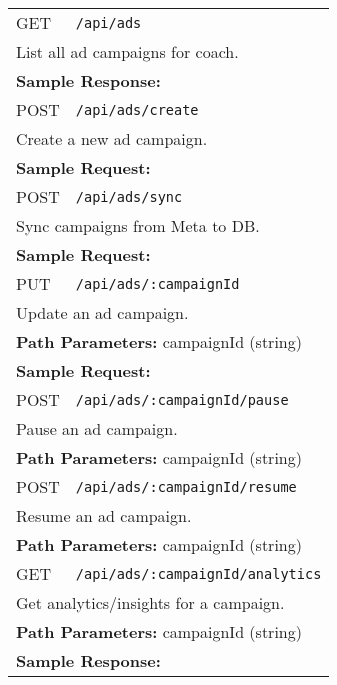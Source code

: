 \documentclass[11pt,a4paper]{article}
\begin{document}
\begin{longtable}{p{2.5cm}p{10cm}}
GET & \texttt{/api/ads} \\
\multicolumn{2}{p{13cm}}{List all ad campaigns for coach.} \\
\multicolumn{2}{p{13cm}}{\textbf{Sample Response:}}
\begin{lstlisting}[language=json]
{"success": true, "data": [{"id": "64f1a2b3c4d5e6f7a8b9c0d1", "name": "My Campaign", "status": "ACTIVE"}]}
\end{lstlisting} \\
POST & \texttt{/api/ads/create} \\
\multicolumn{2}{p{13cm}}{Create a new ad campaign.} \\
\multicolumn{2}{p{13cm}}{\textbf{Sample Request:}}
\begin{lstlisting}[language=json]
{"coachMetaAccountId":"123456789","campaignData":{"name":"My Campaign","objective":"LEAD_GENERATION","budget":100}}
\end{lstlisting} \\
POST & \texttt{/api/ads/sync} \\
\multicolumn{2}{p{13cm}}{Sync campaigns from Meta to DB.} \\
\multicolumn{2}{p{13cm}}{\textbf{Sample Request:}}
\begin{lstlisting}[language=json]
{"coachMetaAccountId":"123456789"}
\end{lstlisting} \\
PUT & \texttt{/api/ads/:campaignId} \\
\multicolumn{2}{p{13cm}}{Update an ad campaign.} \\
\multicolumn{2}{p{13cm}}{\textbf{Path Parameters:} campaignId (string)} \\
\multicolumn{2}{p{13cm}}{\textbf{Sample Request:}}
\begin{lstlisting}[language=json]
{"name":"Updated Name","budget":200}
\end{lstlisting} \\
POST & \texttt{/api/ads/:campaignId/pause} \\
\multicolumn{2}{p{13cm}}{Pause an ad campaign.} \\
\multicolumn{2}{p{13cm}}{\textbf{Path Parameters:} campaignId (string)} \\
POST & \texttt{/api/ads/:campaignId/resume} \\
\multicolumn{2}{p{13cm}}{Resume an ad campaign.} \\
\multicolumn{2}{p{13cm}}{\textbf{Path Parameters:} campaignId (string)} \\
GET & \texttt{/api/ads/:campaignId/analytics} \\
\multicolumn{2}{p{13cm}}{Get analytics/insights for a campaign.} \\
\multicolumn{2}{p{13cm}}{\textbf{Path Parameters:} campaignId (string)} \\
\multicolumn{2}{p{13cm}}{\textbf{Sample Response:}}
\begin{lstlisting}[language=json]
{"success": true, "data": {"impressions": 1000, "clicks": 50, "conversions": 5, "cpc": 2.5}}
\end{lstlisting} \\
\end{longtable}
\end{document}
